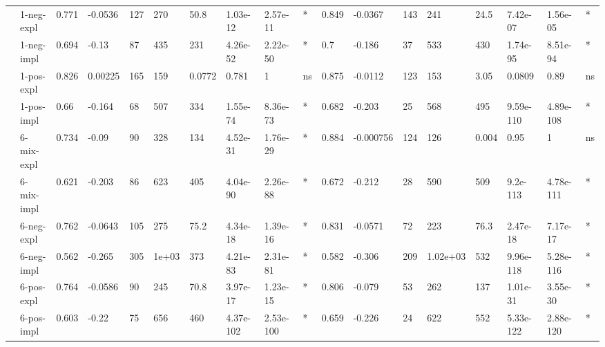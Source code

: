 \begin{table}[hp]
{\begin{adjustbox}{max width=\textwidth}
\begin{tabular}{ll|llllllll|llllllll}
 & 1-neg-expl & 0.771 & -0.0536 & 127 & 270 & 50.8 & 1.03e-12 & 2.57e-11 & * & 0.849 & -0.0367 & 143 & 241 & 24.5 & 7.42e-07 & 1.56e-05 & * \\
 & 1-neg-impl & 0.694 & -0.13 & 87 & 435 & 231 & 4.26e-52 & 2.22e-50 & * & 0.7 & -0.186 & 37 & 533 & 430 & 1.74e-95 & 8.51e-94 & * \\
 & 1-pos-expl & 0.826 & 0.00225 & 165 & 159 & 0.0772 & 0.781 & 1 & ns & 0.875 & -0.0112 & 123 & 153 & 3.05 & 0.0809 & 0.89 & ns \\
 & 1-pos-impl & 0.66 & -0.164 & 68 & 507 & 334 & 1.55e-74 & 8.36e-73 & * & 0.682 & -0.203 & 25 & 568 & 495 & 9.59e-110 & 4.89e-108 & * \\
 & 6-mix-expl & 0.734 & -0.09 & 90 & 328 & 134 & 4.52e-31 & 1.76e-29 & * & 0.884 & -0.000756 & 124 & 126 & 0.004 & 0.95 & 1 & ns \\
 & 6-mix-impl & 0.621 & -0.203 & 86 & 623 & 405 & 4.04e-90 & 2.26e-88 & * & 0.672 & -0.212 & 28 & 590 & 509 & 9.2e-113 & 4.78e-111 & * \\
 & 6-neg-expl & 0.762 & -0.0643 & 105 & 275 & 75.2 & 4.34e-18 & 1.39e-16 & * & 0.831 & -0.0571 & 72 & 223 & 76.3 & 2.47e-18 & 7.17e-17 & * \\
 & 6-neg-impl & 0.562 & -0.265 & 305 & 1e+03 & 373 & 4.21e-83 & 2.31e-81 & * & 0.582 & -0.306 & 209 & 1.02e+03 & 532 & 9.96e-118 & 5.28e-116 & * \\
 & 6-pos-expl & 0.764 & -0.0586 & 90 & 245 & 70.8 & 3.97e-17 & 1.23e-15 & * & 0.806 & -0.079 & 53 & 262 & 137 & 1.01e-31 & 3.55e-30 & * \\
 & 6-pos-impl & 0.603 & -0.22 & 75 & 656 & 460 & 4.37e-102 & 2.53e-100 & * & 0.659 & -0.226 & 24 & 622 & 552 & 5.33e-122 & 2.88e-120 & * \\
\bottomrule
\end{tabular}

\end{adjustbox}
}

\end{table}

\clearpage

